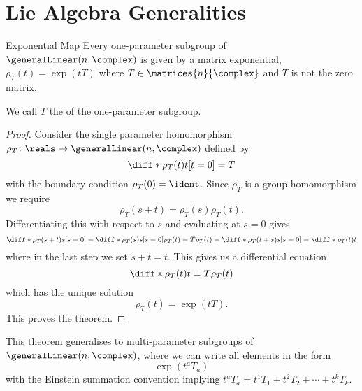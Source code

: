 \section{Lie Algebra Generalities}\label{sec:lie algebra generalities}
\begin{thm}{Exponential Map}{}
    Every one-parameter subgroup of \(\generalLinear(n, \complex)\) is given by a matrix exponential, \(\rho_T(t) = \exp(tT)\) where \(T \in \matrices{n}{\complex}\) and \(T\) is not the zero matrix.
    \begin{rmk}
        We call \(T\) the  of the one-parameter subgroup.
    \end{rmk}
    \begin{proof}
        Consider the single parameter homomorphism \(\rho_T \colon \reals \to \generalLinear(n, \complex)\) defined by
        \begin{equation}
            \diff*{\rho_T(t)}{t}[t = 0] = T
        \end{equation}
        with the boundary condition \(\rho_T(0) = \ident\).
        Since \(\rho_T\) is a group homomorphism we require
        \begin{equation}
            \rho_T(s + t) = \rho_T(s)\rho_T(t).
        \end{equation}
        Differentiating this with respect to \(s\) and evaluating at \(s = 0\) gives
        \begin{equation}
            \diff*{\rho_T(s + t)}{s}[s = 0] = \diff*{\rho_T(s)}{s}[s = 0]\rho_T(t) = T\rho_T(t) = \diff*{\rho_T(t + s)}{s}[s = 0] = \diff*{\rho_T(t)}{t}
        \end{equation}
        where in the last step we set \(s + t = t\).
        This gives us a differential equation
        \begin{equation}
            \diff*{\rho_T(t)}{t} = T\rho_T(t)
        \end{equation}
        which has the unique solution
        \begin{equation}
            \rho_T(t) = \exp(t T).
        \end{equation}
        This proves the theorem.
    \end{proof}
\end{thm}

This theorem generalises to multi-parameter subgroups of \(\generalLinear(n, \complex)\), where we can write all elements in the form
\begin{equation}
    \exp(t^aT_a)
\end{equation}
with the Einstein summation convention implying \(t^aT_a = t^1T_1 + t^2T_2 + \dotsb + t^kT_k\).

